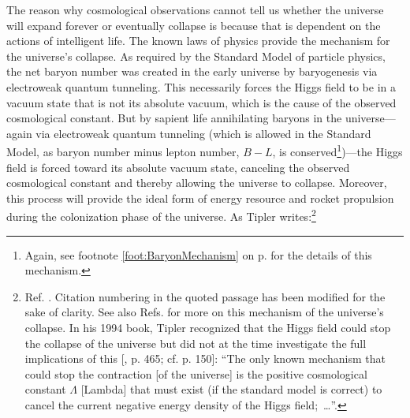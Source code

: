\documentclass[letterpaper,12pt]{article}
\begin{document}
The reason why cosmological observations cannot tell us whether the universe will expand forever or eventually collapse is because that is dependent on the actions of intelligent life. The known laws of physics provide the mechanism for the universe's collapse. As required by the Standard Model of particle physics, the net baryon number was created in the early universe by baryogenesis via electroweak quantum tunneling. This necessarily forces the Higgs field to be in a vacuum state that is not its absolute vacuum, which is the cause of the observed cosmological constant. But by sapient life annihilating baryons in the universe---again via electroweak quantum tunneling (which is allowed in the Standard Model, as baryon number minus lepton number, \( B-L \), is conserved\footnote{Again, see footnote \ref{foot:BaryonMechanism} on p. \pageref{foot:BaryonMechanism} for the details of this mechanism.})---the Higgs field is forced toward its absolute vacuum state, canceling the observed cosmological constant and thereby allowing the universe to collapse. Moreover, this process will provide the ideal form of energy resource and rocket propulsion during the colonization phase of the universe. As Tipler writes:\footnote{Ref. . Citation numbering in the quoted passage has been modified for the sake of clarity. See also Refs.  for more on this mechanism of the universe's collapse. In his 1994 book, Tipler recognized that the Higgs field could stop the collapse of the universe but did not at the time investigate the full implications of this [, p. 465; cf. p. 150]: ``The only known mechanism that could stop the contraction [of the universe] is the positive cosmological constant \( \Lambda \) [Lambda] that must exist (if the standard model is correct) to cancel the current negative energy density of the Higgs field;~\ldots''.}
\end{document}
